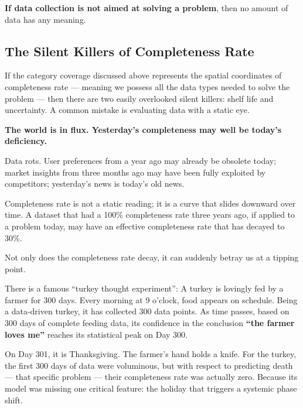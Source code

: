 \textbf{If data collection is not aimed at solving a problem}, then no amount of data has any meaning.

\subsection{The Silent Killers of Completeness Rate}

If the category coverage discussed above represents the spatial coordinates of completeness rate --- meaning we possess all the data types needed to solve the problem --- then there are two easily overlooked silent killers: shelf life and uncertainty.
A common mistake is evaluating data with a static eye.

\textbf{The world is in flux. Yesterday's completeness may well be today's deficiency.}

\vspace{1em}

Data rots.
User preferences from a year ago may already be obsolete today;
market insights from three months ago may have been fully exploited by competitors;
yesterday's news is today's old news.

\vspace{1em}

Completeness rate is not a static reading; it is a curve that slides downward over time.
A dataset that had a 100\% completeness rate three years ago, if applied to a problem today, may have an effective completeness rate that has decayed to 30\%.

\vspace{1em}

Not only does the completeness rate decay, it can suddenly betray us at a tipping point.

There is a famous ``turkey thought experiment'':
A turkey is lovingly fed by a farmer for 300 days. Every morning at 9 o'clock, food appears on schedule.
Being a data-driven turkey, it has collected 300 data points.
As time passes, based on 300 days of complete feeding data, its confidence in the conclusion \textbf{``the farmer loves me''} reaches its statistical peak on Day 300.

\vspace{1em}

On Day 301, it is Thanksgiving. The farmer's hand holds a knife.
For the turkey, the first 300 days of data were voluminous, but with respect to predicting death --- that specific problem --- their completeness rate was actually zero.
Because its model was missing one critical feature: the holiday that triggers a systemic phase shift.

